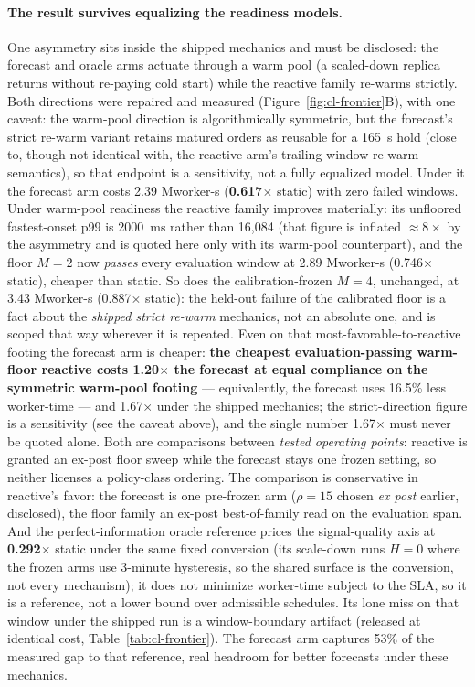 \paragraph{The result survives equalizing the readiness models.} One asymmetry
sits inside the shipped mechanics and must be disclosed: the forecast and
oracle arms actuate through a warm pool (a scaled-down replica returns without
re-paying cold start) while the reactive family re-warms strictly. Both
directions were repaired and measured (Figure~\ref{fig:cl-frontier}B), with
one caveat: the warm-pool direction is algorithmically symmetric, but the
forecast's strict re-warm variant retains matured orders as reusable for a
\SI{165}{\second} hold (close to, though not identical with, the reactive
arm's trailing-window re-warm semantics), so that endpoint is a sensitivity,
not a fully equalized model. Under it the
forecast arm costs 2.39 Mworker-s (\textbf{0.617$\times$} static) with zero
failed windows. Under warm-pool readiness the reactive family improves
materially: its unfloored fastest-onset p99 is \SI{2000}{\milli\second} rather
than 16{,}084 (that figure is inflated ${\approx}8\times$ by the asymmetry and is
quoted here only with its warm-pool counterpart), and the floor $M{=}2$ now
\emph{passes} every evaluation window at 2.89 Mworker-s (0.746$\times$ static), cheaper
than static. So does the calibration-frozen $M{=}4$, unchanged, at 3.43
Mworker-s (0.887$\times$ static): the held-out failure of the calibrated floor
is a fact about the \emph{shipped strict re-warm} mechanics, not an absolute
one, and is scoped that way wherever it is repeated. Even on that
most-favorable-to-reactive footing the forecast arm
is cheaper: \textbf{the cheapest evaluation-passing warm-floor reactive costs
1.20$\times$ the forecast at equal compliance on the symmetric warm-pool
footing} --- equivalently, the forecast uses 16.5\% less worker-time ---
and 1.67$\times$ under the shipped mechanics; the strict-direction figure is
a sensitivity (see the caveat above), and the single number 1.67$\times$ must
never be quoted alone. Both are comparisons between \emph{tested operating
points}: reactive is granted an ex-post floor sweep while the forecast stays
one frozen setting, so neither licenses a policy-class ordering. The
comparison is conservative in reactive's favor: the forecast is one
pre-frozen arm ($\rho{=}15$ chosen \emph{ex post} earlier, disclosed), the floor family an ex-post best-of-family read on the evaluation span.
And the perfect-information oracle reference prices the signal-quality axis
at \textbf{0.292$\times$} static under the same fixed conversion
(its scale-down runs $H{=}0$ where the frozen arms use 3-minute hysteresis,
so the shared surface is the conversion, not every mechanism); it does not minimize worker-time subject to the SLA, so it is a
reference, not a lower bound over admissible schedules. Its lone miss on that
window under the shipped run is a window-boundary artifact (released at
identical cost, Table~\ref{tab:cl-frontier}). The forecast arm captures 53\%
of the measured gap to that reference, real headroom for better forecasts
under these mechanics.

